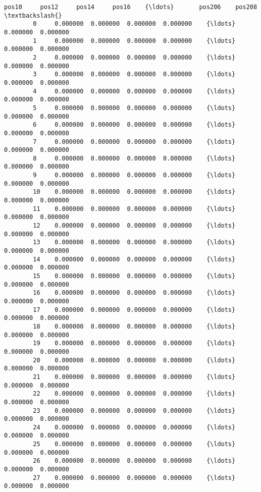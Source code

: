 \documentclass[11pt]{article}
\begin{document}
\begin{Verbatim}[commandchars=\\\{\}]
                 pos10     pos12     pos14     pos16    {\ldots}       pos206    pos208  \textbackslash{}
        0     0.000000  0.000000  0.000000  0.000000    {\ldots}     0.000000  0.000000   
        1     0.000000  0.000000  0.000000  0.000000    {\ldots}     0.000000  0.000000   
        2     0.000000  0.000000  0.000000  0.000000    {\ldots}     0.000000  0.000000   
        3     0.000000  0.000000  0.000000  0.000000    {\ldots}     0.000000  0.000000   
        4     0.000000  0.000000  0.000000  0.000000    {\ldots}     0.000000  0.000000   
        5     0.000000  0.000000  0.000000  0.000000    {\ldots}     0.000000  0.000000   
        6     0.000000  0.000000  0.000000  0.000000    {\ldots}     0.000000  0.000000   
        7     0.000000  0.000000  0.000000  0.000000    {\ldots}     0.000000  0.000000   
        8     0.000000  0.000000  0.000000  0.000000    {\ldots}     0.000000  0.000000   
        9     0.000000  0.000000  0.000000  0.000000    {\ldots}     0.000000  0.000000   
        10    0.000000  0.000000  0.000000  0.000000    {\ldots}     0.000000  0.000000   
        11    0.000000  0.000000  0.000000  0.000000    {\ldots}     0.000000  0.000000   
        12    0.000000  0.000000  0.000000  0.000000    {\ldots}     0.000000  0.000000   
        13    0.000000  0.000000  0.000000  0.000000    {\ldots}     0.000000  0.000000   
        14    0.000000  0.000000  0.000000  0.000000    {\ldots}     0.000000  0.000000   
        15    0.000000  0.000000  0.000000  0.000000    {\ldots}     0.000000  0.000000   
        16    0.000000  0.000000  0.000000  0.000000    {\ldots}     0.000000  0.000000   
        17    0.000000  0.000000  0.000000  0.000000    {\ldots}     0.000000  0.000000   
        18    0.000000  0.000000  0.000000  0.000000    {\ldots}     0.000000  0.000000   
        19    0.000000  0.000000  0.000000  0.000000    {\ldots}     0.000000  0.000000   
        20    0.000000  0.000000  0.000000  0.000000    {\ldots}     0.000000  0.000000   
        21    0.000000  0.000000  0.000000  0.000000    {\ldots}     0.000000  0.000000   
        22    0.000000  0.000000  0.000000  0.000000    {\ldots}     0.000000  0.000000   
        23    0.000000  0.000000  0.000000  0.000000    {\ldots}     0.000000  0.000000   
        24    0.000000  0.000000  0.000000  0.000000    {\ldots}     0.000000  0.000000   
        25    0.000000  0.000000  0.000000  0.000000    {\ldots}     0.000000  0.000000   
        26    0.000000  0.000000  0.000000  0.000000    {\ldots}     0.000000  0.000000   
        27    0.000000  0.000000  0.000000  0.000000    {\ldots}     0.000000  0.000000   

\end{Verbatim}
\end{document}
